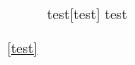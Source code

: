 \documentclass{memoir}
\begin{document}
\makeatletter
\newif\ifcaptionrefstepcounter
\let\caption@refstepcounter@ORI\caption@refstepcounter
\renewcommand*\caption@refstepcounter{\global\captionrefstepcountertrue\caption@refstepcounter@ORI}
\makeatother

\mbox{}
\clearpage

\begin{figure}
  \captionrefstepcounterfalse
%
  \begin{sidecaption}{test}[test]
    test
  \end{sidecaption}
%
  \ifcaptionrefstepcounter
    \typeout{\string\caption@refstepcounter was used}%
  \else
    \PackageError{caption}{\string\caption@refstepcounter was not used}{}%
  \fi
\end{figure}

\ref{test} %
\end{document}
